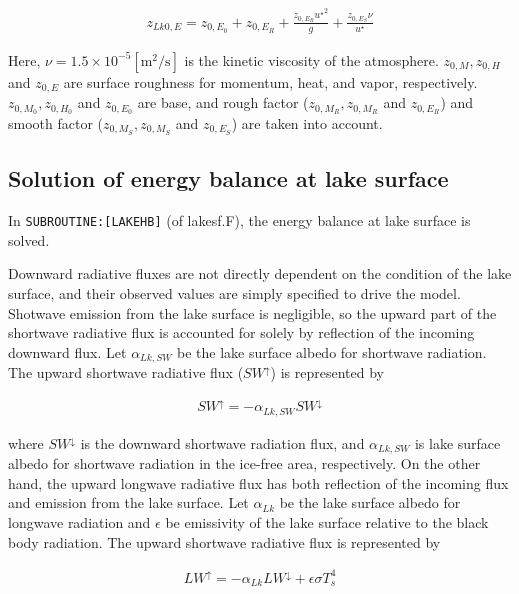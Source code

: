 \begin{eqnarray}
    z_{Lk0,E} = z_{0,E_0} + z_{0,E_R} + \frac{z_{0,E_R} {u^\star }^2 }{g} + \frac{z_{0,E_S}\nu }{u^\star}
\end{eqnarray}

Here, \(\nu = 1.5 \times 10^{-5} \mathrm{[m^2/s]}\) is the kinetic
viscosity of the atmosphere. \(z_{0,M},z_{0,H}\) and \(z_{0,E}\) are
surface roughness for momentum, heat, and vapor, respectively.
\(z_{0,M_0},z_{0,H_0}\) and \(z_{0,E_0}\) are base, and rough factor
(\(z_{0,M_R},z_{0,M_R}\) and \(z_{0,E_R}\)) and smooth factor
(\(z_{0,M_S},z_{0,M_S}\) and \(z_{0,E_S}\)) are taken into account.

\hypertarget{solution-of-energy-balance-at-lake-surface}{%
\subsection{Solution of energy balance at lake
surface}\label{solution-of-energy-balance-at-lake-surface}}

In \texttt{SUBROUTINE:{[}LAKEHB{]}} (of lakesf.F), the energy balance at
lake surface is solved.

Downward radiative fluxes are not directly dependent on the condition of
the lake surface, and their observed values are simply specified to
drive the model. Shotwave emission from the lake surface is negligible,
so the upward part of the shortwave radiative flux is accounted for
solely by reflection of the incoming downward flux. Let
\(\alpha_{Lk,SW}\) be the lake surface albedo for shortwave radiation.
The upward shortwave radiative flux (\(SW^\uparrow\)) is represented by

\begin{eqnarray}
    SW^\uparrow = - \alpha_{Lk,SW} SW^\downarrow
\end{eqnarray}

where \(SW^\downarrow\) is the downward shortwave radiation flux, and
\(\alpha_{Lk,SW}\) is lake surface albedo for shortwave radiation in the
ice-free area, respectively. On the other hand, the upward longwave
radiative flux has both reflection of the incoming flux and emission
from the lake surface. Let \(\alpha_{Lk}\) be the lake surface albedo
for longwave radiation and \(\epsilon\) be emissivity of the lake
surface relative to the black body radiation. The upward shortwave
radiative flux is represented by

\begin{eqnarray}
    LW^\uparrow = - \alpha_{Lk} LW^\downarrow + \epsilon \sigma T_s ^4
\end{eqnarray}

